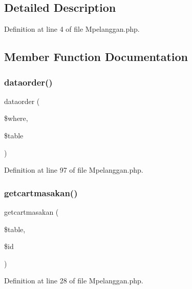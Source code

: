 \subsection{Detailed Description}


Definition at line 4 of file Mpelanggan.\+php.



\subsection{Member Function Documentation}
\mbox{\label{class_mpelanggan_a14a9728dea7c640c4a8c2b2b2e31b78b}} 
\subsubsection{\texorpdfstring{dataorder()}{dataorder()}}
{\footnotesize\ttfamily dataorder (\begin{DoxyParamCaption}\item[{}]{\$where,  }\item[{}]{\$table }\end{DoxyParamCaption})}



Definition at line 97 of file Mpelanggan.\+php.

\mbox{\label{class_mpelanggan_a2198aaef72ab6b5eb46c54b7a48569cf}} 
\subsubsection{\texorpdfstring{getcartmasakan()}{getcartmasakan()}}
{\footnotesize\ttfamily getcartmasakan (\begin{DoxyParamCaption}\item[{}]{\$table,  }\item[{}]{\$id }\end{DoxyParamCaption})}



Definition at line 28 of file Mpelanggan.\+php.

\mbox{\label{class_mpelanggan_af6cb3909c84d55dc39b68e22ad1c7ad3}} 
